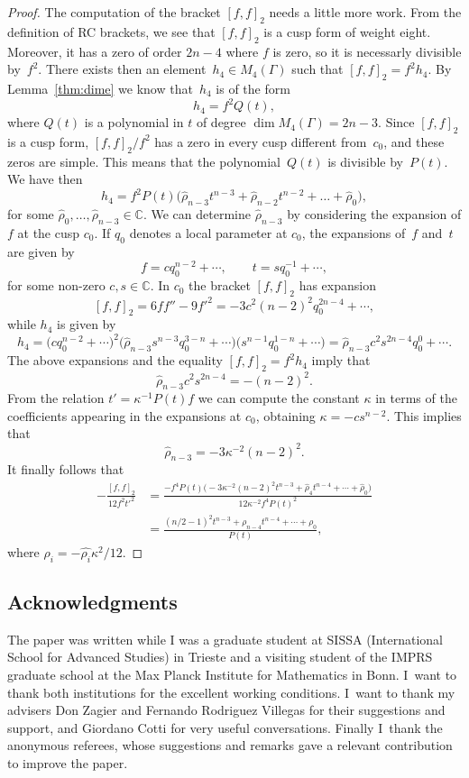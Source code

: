 \documentclass[pdftex]{sigma}
\newcommand{\C}{\mathbb{C}}
\numberwithin{equation}{section}
\begin{document}
\begin{proof}
The computation of the bracket $[f,f]_2$ needs a little more work. From the definition of RC brackets, we see that $[f,f]_2$ is a cusp form of weight eight. Moreover, it has a zero of order $2n-4$ where $f$ is zero, so it is necessarly divisible by~$f^2$. There exists then an element~$h_4\in M_4(\Gamma)$ such that $[f,f]_2=f^2h_4$. By Lemma~\ref{thm:dime} we know that~$h_4$ is of the form
\[
h_4=f^2Q(t),
\]
where $Q(t)$ is a polynomial in $t$ of degree $\dim{M_4(\Gamma)}=2n-3$. Since $[f,f]_2$ is a cusp form, $[f,f]_2/f^2$ has a zero in every cusp different from~$c_0$, and these zeros are simple. This means that the polynomial~$Q(t)$ is divisible by~$P(t)$. We have then
\[
h_4=f^2P(t)\bigl(\hat{\rho}_{n-3}t^{n-3}+\hat{\rho}_{n-2}t^{n-2}+\dots+\hat{\rho}_0\bigr),
\]
for some $\hat{\rho}_0,\dots,\hat{\rho}_{n-3}\in\C$. We can determine $\hat{\rho}_{n-3}$ by considering the expansion of $f$ at the cusp $c_0$. If $q_0$ denotes a local parameter at $c_0$, the expansions of~$f$ and~$t$ are given by
\[
f=cq_0^{n-2}+\cdots,\qquad t=sq_0^{-1}+\cdots,
\]
for some non-zero $c,s\in\C$.
In $c_0$ the bracket $[f,f]_2$ has expansion
\[
[f,f]_2=6ff''-9f'^2=-3c^2(n-2)^2q_0^{2n-4}+\cdots,
\]
while $h_4$ is given by
\[
h_4=\bigl(cq_0^{n-2}+\cdots\bigr)^2\bigl(\hat{\rho}_{n-3}s^{n-3}q_0^{3-n}+\cdots\bigr)\bigl(s^{n-1}q_0^{1-n}+\cdots\bigr)= \hat{\rho}_{n-3}c^2s^{2n-4}q_0^0+\cdots.
\]
The above expansions and the equality $[f,f]_2=f^2h_4$ imply that
\[
\hat{\rho}_{n-3}c^2s^{2n-4}=-(n-2)^2.
\]
From the relation $t'=\kappa^{-1}P(t)f$ we can compute the constant $\kappa$ in terms of the coefficients appearing in the expansions at $c_0$, obtaining $\kappa = -cs^{n-2}$. This implies that
\[
\hat{\rho}_{n-3}=-3\kappa^{-2}(n-2)^2.
\]
It finally follows that
\begin{align*}
-\frac{[f,f]_2}{12f^2t'^2}&=\frac{-f^4P(t)\big({-}3\kappa^{-2}(n-2)^2t^{n-3}+\hat{\rho}_4t^{n-4}+\cdots+\hat{\rho}_0\big)}{12\kappa^{-2}f^4P(t)^2}\\
 &=\frac{(n/2-1)^2t^{n-3}+\rho_{n-4}t^{n-4}+\cdots+\rho_0}{P(t)},
\end{align*}
where $\rho_i=-\hat{\rho_i}\kappa^2/12$.
\end{proof}

\subsection*{Acknowledgments}
The paper was written while I was a graduate student at SISSA (International School for Advanced Studies) in Trieste and a visiting student of the IMPRS graduate school at the Max Planck Institute for Mathematics in Bonn. I~want to thank both institutions for the excellent working conditions. I~want to thank my advisers Don Zagier and Fernando Rodriguez Villegas for their suggestions and support, and Giordano Cotti for very useful conversations. Finally I~thank the anonymous referees, whose suggestions and remarks gave a relevant contribution to improve the paper.
\end{document}

